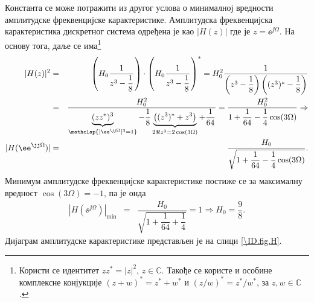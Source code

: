 Константа се може потражити из другог услова о минималној вредности амплитудске фреквенцијске карактеристике.
Амплитудска фреквенцијска карактеристика дискретног система одређена је као $|H(z)|$ где је 
$ z = \ee^{\jj\Omega}$. На основу тога, даље се има\footnote{
    Користи се идентитет $z z^{\ast} = |z|^2$, $z \in \mathbb C$. Такође се користе и особине комплексне конјукције
    $(z + w)^* = z^* + w^*$ и $(z/w)^* = z^*/w^*$, за $z,w\in\mathbb C$.
}
\begin{eqnarray}
    |H(z)|^2 &=& \left( H_0 \dfrac{1}{z^3 - \dfrac{1}{8}} \right) \cdot  \left( H_0 \dfrac{1}{z^3 - \dfrac{1}{8}} \right)^*
              =  H_0^2 \dfrac{1}{ \left(z^3 - \dfrac{1}{8}\right)\left((z^3)^* - \dfrac{1}{8}\right)  } 
            \\
             &=& \dfrac{H_0^2}{ \underbrace{(zz^*)^3}_{\mathclap{ |\ee^{\jj\Omega}|^3 = 1 }} - \dfrac{1}{8} 
             \underbrace{\left( (z^3)^* + z^3 \right)}_{2\Re{z^3} = 2\cos(3\Omega) } + \dfrac{1}{64} } 
             = 
             \dfrac{H_0^2}{ 1 + \dfrac{1}{64} - \dfrac{1}{4}\cos(3\Omega) } \Rightarrow \\
    |H(\ee^{\jj\Omega})| &=& \dfrac{H_0}{ \sqrt{ 1 + \dfrac{1}{64} - \dfrac{1}{4}\cos(3\Omega)} }.
\end{eqnarray}
Минимум амплитудске фреквенцијске карактеристике постиже се за максималну вредност $\cos(3\Omega) = -1$, па је онда 
\begin{eqnarray}
    |H(\ee^{\jj\Omega})|_{\min} &=& \dfrac{H_0}{ \sqrt{ 1 + \dfrac{1}{64} + \dfrac{1}{4} } } = 1 
    \Rightarrow H_0 = \dfrac{9}{8}.
\end{eqnarray}
Дијаграм амплитудске карактеристике представљен је на слици \ref{\ID.fig.H}.
